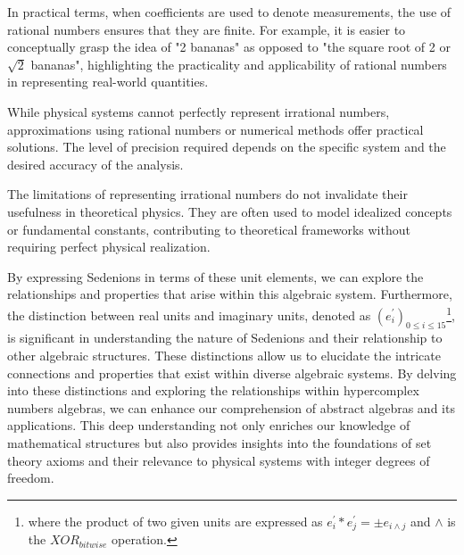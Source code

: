 \documentclass{article}
\begin{document}
In practical terms, when coefficients are used to denote measurements, the use of rational numbers ensures that they are finite. For example, it is easier to conceptually grasp the idea of "2 bananas" as opposed to "the square root of 2 or $\sqrt{2}$ bananas", highlighting the practicality and applicability of rational numbers in representing real-world quantities.

While physical systems cannot perfectly represent irrational numbers, approximations using rational numbers or numerical methods offer practical solutions. The level of precision required depends on the specific system and the desired accuracy of the analysis.

The limitations of representing irrational numbers do not invalidate their usefulness in theoretical physics. They are often used to model idealized concepts or fundamental constants, contributing to theoretical frameworks without requiring perfect physical realization.



By expressing Sedenions in terms of these unit elements, we can explore the relationships and properties that arise within this algebraic system. Furthermore, the distinction between real units and imaginary units, denoted as $(e^{'}_{i})_{0 \leq i \leq 15}$\footnote{where the product of two given units are expressed as
$e^{'}_{i}*e^{'}_{j}=\pm e_{i \wedge j}$ and $\wedge$ is the $XOR_{bitwise}$ operation.}, is significant in understanding the nature of Sedenions and their relationship to other algebraic structures. These distinctions allow us to elucidate the intricate connections and properties that exist within diverse algebraic systems. By delving into these distinctions and exploring the relationships within hypercomplex numbers algebras, we can enhance our comprehension of abstract algebras and its applications. This deep understanding not only enriches our knowledge of mathematical structures but also provides insights into the foundations of set theory axioms and their relevance to physical systems with integer degrees of freedom.
\end{document}
